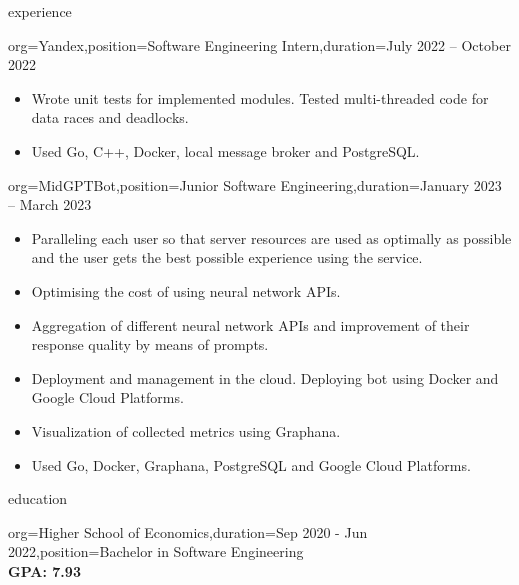 \documentclass{resume}
\begin{document}
\begin{ResumeSection}{experience}
\begin{ResumeSubsection}{org=Yandex,position={Software Engineering Intern},duration=July 2022 – October 2022}
\begin{itemize}
            \item {
                Wrote unit tests for implemented modules. Tested multi-threaded code for data races and deadlocks.
            }

            \item {
                Used Go, C++, Docker, local message broker and PostgreSQL.
            }
        \end{itemize}
    \end{ResumeSubsection}

    \begin{ResumeSubsection}{org=MidGPTBot,position={Junior Software Engineering},duration=January 2023 – March 2023}
        \begin{itemize}
            \item {
                Paralleling each user so that server resources are used as optimally as possible and the user gets the best possible experience using the service.
            }

            \item {
                Optimising the cost of using neural network APIs.
            }

            \item {
                Aggregation of different neural network APIs and improvement of their response \- quality by means of prompts.
            }

            \item {
                Deployment and management in the cloud. Deploying bot using Docker and Google Cloud Platforms.
            }

            \item {
                Visualization of collected metrics using Graphana.
            }

            \item {
                Used Go, Docker, Graphana, PostgreSQL and Google Cloud Platforms.
            }
        \end{itemize}
    \end{ResumeSubsection}
\end{ResumeSection}

\begin{ResumeSection}{education}
    \begin{ResumeSubsection}{org={Higher School of Economics},duration={Sep 2020 - Jun 2022},position={Bachelor in Software Engineering}}
        \\\bf GPA: 7.93 
    \end{ResumeSubsection}
\end{ResumeSection}
\end{document}
